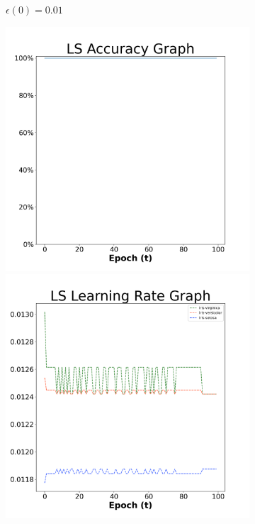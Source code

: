 \begin{figure}[H]
\begin{subfigure}{0.3\textwidth}
  \caption{$\epsilon(0)=0.01$}
\end{subfigure}\hfil %
\begin{subfigure}{0.3\textwidth}
  \includegraphics[width=\linewidth]{images/exper1/iris/LS_0.03_acc.png}
  \includegraphics[width=\linewidth]{images/exper1/iris/LS_0.03_lr.png}

\end{subfigure}
\end{figure}
